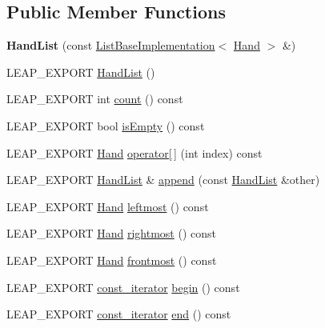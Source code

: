 \subsection*{Public Member Functions}
\begin{DoxyCompactItemize}
\item 
\mbox{\label{class_leap_1_1_hand_list_a5f0e45c94fcbb0e43395732142bd7bb1}} 
{\bfseries Hand\+List} (const \hyperlink{class_leap_1_1_list_base_implementation}{List\+Base\+Implementation}$<$ \hyperlink{class_leap_1_1_hand}{Hand} $>$ \&)
\item 
L\+E\+A\+P\+\_\+\+E\+X\+P\+O\+RT \hyperlink{class_leap_1_1_hand_list_a98b159b1e306e8ae0da3d99ae1eba8d3}{Hand\+List} ()
\item 
L\+E\+A\+P\+\_\+\+E\+X\+P\+O\+RT int \hyperlink{class_leap_1_1_hand_list_a91ac67ed01b575c7b3ef76486505105f}{count} () const
\item 
L\+E\+A\+P\+\_\+\+E\+X\+P\+O\+RT bool \hyperlink{class_leap_1_1_hand_list_a219e6515714fd2466d895a0071894d51}{is\+Empty} () const
\item 
L\+E\+A\+P\+\_\+\+E\+X\+P\+O\+RT \hyperlink{class_leap_1_1_hand}{Hand} \hyperlink{class_leap_1_1_hand_list_a83ae24fb8d7f7e7acfa5edbcfdd2c87c}{operator\mbox{[}$\,$\mbox{]}} (int index) const
\item 
L\+E\+A\+P\+\_\+\+E\+X\+P\+O\+RT \hyperlink{class_leap_1_1_hand_list}{Hand\+List} \& \hyperlink{class_leap_1_1_hand_list_a7715a0e0df3e513c6cb1869691ef982d}{append} (const \hyperlink{class_leap_1_1_hand_list}{Hand\+List} \&other)
\item 
L\+E\+A\+P\+\_\+\+E\+X\+P\+O\+RT \hyperlink{class_leap_1_1_hand}{Hand} \hyperlink{class_leap_1_1_hand_list_a8b2fc4b411614212be1ea71f3844e8c5}{leftmost} () const
\item 
L\+E\+A\+P\+\_\+\+E\+X\+P\+O\+RT \hyperlink{class_leap_1_1_hand}{Hand} \hyperlink{class_leap_1_1_hand_list_a6094a73553380e84693b2cd96ce720dd}{rightmost} () const
\item 
L\+E\+A\+P\+\_\+\+E\+X\+P\+O\+RT \hyperlink{class_leap_1_1_hand}{Hand} \hyperlink{class_leap_1_1_hand_list_a25714b1732a5075c51e1acaf202cbe1f}{frontmost} () const
\item 
L\+E\+A\+P\+\_\+\+E\+X\+P\+O\+RT \hyperlink{class_leap_1_1_hand_list_a9c35a4db8fd94a3b1a029efecbd13668}{const\+\_\+iterator} \hyperlink{class_leap_1_1_hand_list_a134157c3f6bb1521b97a8194801788fc}{begin} () const
\item 
L\+E\+A\+P\+\_\+\+E\+X\+P\+O\+RT \hyperlink{class_leap_1_1_hand_list_a9c35a4db8fd94a3b1a029efecbd13668}{const\+\_\+iterator} \hyperlink{class_leap_1_1_hand_list_a9a975bb7abeb64e1bccb3d2ce32bc07b}{end} () const
\end{DoxyCompactItemize}
